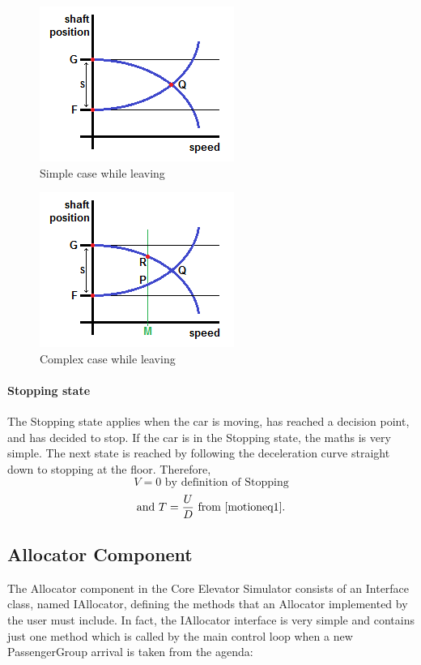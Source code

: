 \documentclass{UoYCSproject}
\begin{document}
\begin{figure} [h]
	\centering
	\includegraphics{leaving_simp.png}
	\caption{Simple case while leaving}
	\label{leavingsimp}
\end{figure}

\begin{figure} [h]
	\centering
	\includegraphics{leaving_comp.png}
	\caption{Complex case while leaving}
	\label{leavingcomp}
\end{figure}

\paragraph{Stopping state}

The Stopping state applies when the car is moving, has reached a decision point, and has decided to stop.  If the car is in the Stopping state, the maths is very simple.  The next state is reached by following the deceleration curve straight down to stopping at the floor.  Therefore,
\[ V=0 \text{ by definition of Stopping} \]
\[ \text{and } T=\frac{U}{D} \text{ from \autoref{motioneq1}.} \]

\subsection{Allocator Component}
\label{coresimallocatordescription}

The Allocator component in the Core Elevator Simulator consists of an Interface class, named IAllocator, defining the methods that an Allocator implemented by the user must include.  In fact, the IAllocator interface is very simple and contains just one method which is called by the main control loop when a new PassengerGroup arrival is taken from the agenda:
\end{document}
